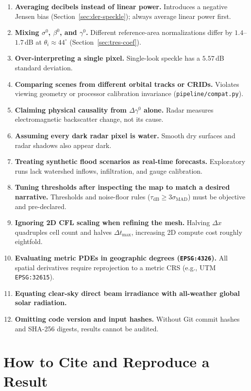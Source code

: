 \documentclass[11pt,a4paper]{article}
\newcommand{\src}[1]{\nolinkurl{#1}}
\begin{document}
\begin{enumerate}
  \item \textbf{Averaging decibels instead of linear power.} Introduces a negative Jensen bias (Section~\ref{sec:der-speckle}); always average linear power first.
  \item \textbf{Mixing $\sigma^0$, $\beta^0$, and $\gamma^0$.} Different reference-area normalizations differ by $1.4$--$1.7$\,dB at $\theta_i\approx 44^\circ$ (Section~\ref{sec:tres-coef}).
  \item \textbf{Over-interpreting a single pixel.} Single-look speckle has a $5.57$\,dB standard deviation.
  \item \textbf{Comparing scenes from different orbital tracks or CRIDs.} Violates viewing geometry or processor calibration invariance (\src{pipeline/compat.py}).
  \item \textbf{Claiming physical causality from $\Delta\gamma^0$ alone.} Radar measures electromagnetic backscatter change, not its cause.
  \item \textbf{Assuming every dark radar pixel is water.} Smooth dry surfaces and radar shadows also appear dark.
  \item \textbf{Treating synthetic flood scenarios as real-time forecasts.} Exploratory runs lack watershed inflows, infiltration, and gauge calibration.
  \item \textbf{Tuning thresholds after inspecting the map to match a desired narrative.} Thresholds and noise-floor rules ($\tau_{\mathrm{dB}} \ge 3\sigma_{\mathrm{MAD}}$) must be objective and pre-declared.
  \item \textbf{Ignoring 2D CFL scaling when refining the mesh.} Halving $\Delta x$ quadruples cell count and halves $\Delta t_{\max}$, increasing 2D compute cost roughly eightfold.
  \item \textbf{Evaluating metric PDEs in geographic degrees (\texttt{EPSG:4326}).} All spatial derivatives require reprojection to a metric CRS (e.g., UTM \texttt{EPSG:32615}).
  \item \textbf{Equating clear-sky direct beam irradiance with all-weather global solar radiation.}
  \item \textbf{Omitting code version and input hashes.} Without Git commit hashes and SHA-256 digests, results cannot be audited.
\end{enumerate}

\section{How to Cite and Reproduce a Result}
\label{sec:reproducir}
\end{document}
